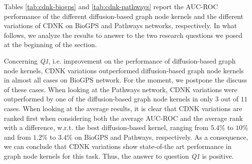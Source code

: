 \documentclass[review]{elsarticle}
\begin{document}
Tables \ref{tab:cdnk-biogps} and \ref{tab:cdnk-pathways} report the AUC-ROC performance of the different diffusion-based graph node kernels and the different variations of CDNK on BioGPS and Pathways networks, respectively. In what follows, we analyze the results to answer to the two research questions we posed at the beginning of the section.

Concerning {\it Q1}, i.e. improvement on the performance of diffusion-based graph node kernels, CDNK variations outperformed diffusion-based graph node kernels in almost all cases on BioGPS network. For the moment, we postpone the discuss of these cases. When looking at the Pathways network, CDNK variations were outperformed by one of the diffusion-based graph node kernels in only $3$ out of $11$ cases. 
When looking at the average results, it is clear that
CDNK variations are ranked first when considering both the average AUC-ROC and the average rank with a difference, w.r.t. the best diffusion-based kernel, ranging from $5.4\%$ to $10\%$ and from $1.2\%$ to $3.4\%$ on BioGPS and Pathways, respectively. As a consequence, we can conclude that CDNK variations show state-of-the art performance in graph node kernels for this task. Thus, the answer to question {\it Q1} is positive.
\end{document}
